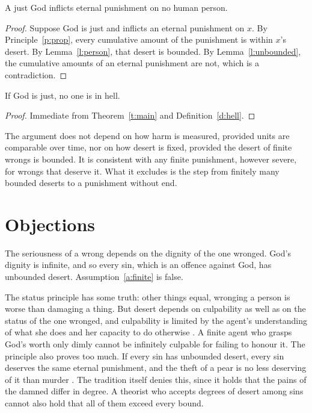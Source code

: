 \documentclass{situationist-preprint}
\begin{document}
\begin{theorem}\label{t:main}
A just God inflicts eternal punishment on no human person.
\end{theorem}

\begin{proof}
Suppose God is just and inflicts an eternal punishment on $x$. By Principle~\ref{p:prop}, every cumulative amount of the punishment is within $x$'s desert. By Lemma~\ref{l:person}, that desert is bounded. By Lemma~\ref{l:unbounded}, the cumulative amounts of an eternal punishment are not, which is a contradiction.
\end{proof}

\begin{corollary}\label{c:empty}
If God is just, no one is in hell.
\end{corollary}

\begin{proof}
Immediate from Theorem~\ref{t:main} and Definition~\ref{d:hell}.
\end{proof}

The argument does not depend on how harm is measured, provided units are comparable over time, nor on how desert is fixed, provided the desert of finite wrongs is bounded. It is consistent with any finite punishment, however severe, for wrongs that deserve it. What it excludes is the step from finitely many bounded deserts to a punishment without end.

\section{Objections}

\begin{objection}
The seriousness of a wrong depends on the dignity of the one wronged. God's dignity is infinite, and so every sin, which is an offence against God, has unbounded desert. Assumption~\ref{a:finite} is false.
\end{objection}

\begin{reply}
The status principle has some truth: other things equal, wronging a person is worse than damaging a thing. But desert depends on culpability as well as on the status of the one wronged, and culpability is limited by the agent's understanding of what she does and her capacity to do otherwise \citep{Adams1975}. A finite agent who grasps God's worth only dimly cannot be infinitely culpable for failing to honour it. The principle also proves too much. If every sin has unbounded desert, every sin deserves the same eternal punishment, and the theft of a pear is no less deserving of it than murder \citep{Kvanvig1993}. The tradition itself denies this, since it holds that the pains of the damned differ in degree. A theorist who accepts degrees of desert among sins cannot also hold that all of them exceed every bound.
\end{reply}
\end{document}
